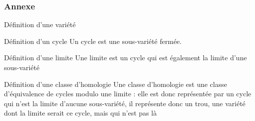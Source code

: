 \documentclass{beamer}
\begin{document}
\begin{frame}
    \frametitle{Annexe}
    \begin{block}{Définition d'une variété}
        
    \end{block}
    \begin{block}{Définition d'un cycle}
        Un cycle est une sous-variété fermée.
    \end{block}
    \begin{block}{Définition d'une limite}
        Une limite est un cycle qui est également la limite d'une
        sous-variété 
    \end{block}
    \begin{block}{Définition d'une classe d'homologie}
        Une classe d'homologie est une classe d'équivalence de 
        cycles modulo une limite : elle est donc représentée par un
        cycle qui n'est la limite d'aucune sous-variété, il représente 
        donc un trou, une variété dont la limite serait ce cycle, mais qui n'est pas là
    \end{block}
\end{frame}
\end{document}
